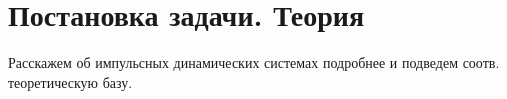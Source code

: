 \chapter{Постановка задачи. Теория}
\label{ch:theory}

Расскажем об импульсных динамических системах подробнее и подведем
соотв. теоретическую базу.